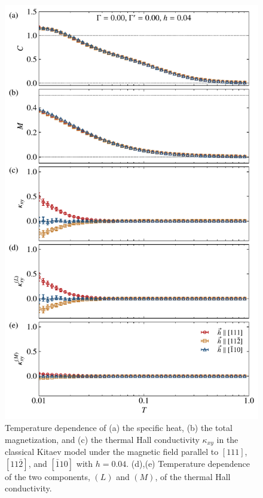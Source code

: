 \documentclass[reprint,amsmath,amssymb,aps,prx]{revtex4-2}
\begin{document}
\begin{figure}[tbh] 
\begin{center} 
\includegraphics[width=0.9\linewidth]{Figs/fig_K-1.0_G0.00_Gp0.00_h0.04.pdf}
\vspace{-0.5cm} 
\caption{Temperature dependence of (a) the specific heat, (b) the total magnetization, and
(c) the thermal Hall conductivity $\kappa_{xy}$ in the classical Kitaev model under the magnetic field parallel to $[111]$, $[11\bar{2}]$, and $[\bar{1}10]$ with $h=0.04$.
(d),(e) Temperature dependence of the two components, $(L)$ and $(M)$, of the thermal Hall conductivity.}
\label{fig_classical_adep004}
\end{center}
\end{figure}
  
\end{document}
